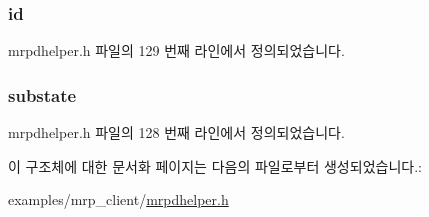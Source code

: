 \subsubsection[{\texorpdfstring{id}{id}}]{ id}\hypertarget{structmrpdhelper__msrp__listener_a7e290573ef1be67b92a2c745e3b00d1d}{}\label{structmrpdhelper__msrp__listener_a7e290573ef1be67b92a2c745e3b00d1d}


mrpdhelper.\+h 파일의 129 번째 라인에서 정의되었습니다.

\subsubsection[{\texorpdfstring{substate}{substate}}]{ substate}\hypertarget{structmrpdhelper__msrp__listener_a77fc98efbb49dcae027e0dde935b7070}{}\label{structmrpdhelper__msrp__listener_a77fc98efbb49dcae027e0dde935b7070}


mrpdhelper.\+h 파일의 128 번째 라인에서 정의되었습니다.



이 구조체에 대한 문서화 페이지는 다음의 파일로부터 생성되었습니다.\+:\begin{DoxyCompactItemize}
\item 
examples/mrp\+\_\+client/\hyperlink{mrpdhelper_8h}{mrpdhelper.\+h}\end{DoxyCompactItemize}
